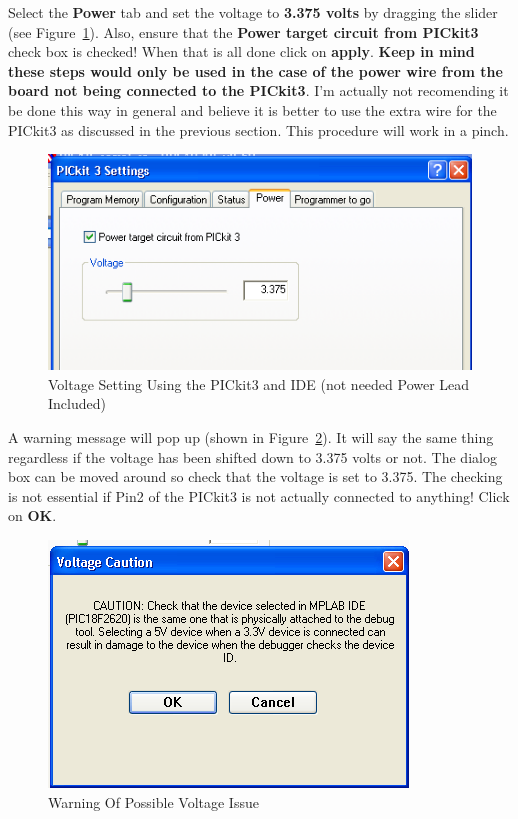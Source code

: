 \documentclass[twocolumn]{article}
\makeatletter
\def\maxwidth{\ifdim\Gin@nat@width>\linewidth\linewidth
\else\Gin@nat@width\fi}
\let\Oldincludegraphics\includegraphics
\renewcommand{\includegraphics}[1]{\Oldincludegraphics[width=\maxwidth]{#1}}
\makeatother
\begin{document}
Select the \textbf{Power} tab and set the voltage to \textbf{3.375
volts} by dragging the slider (see Figure~\ref{voltagesetting}). Also, ensure that the \textbf{Power
target circuit from PICkit3} check box is checked! When that is all done
click on \textbf{apply}. \textbf{Keep in mind these steps would only be used 
in the case of the power wire from the board not being connected to the PICkit3}. I'm
 actually not recomending it be done this way in general and believe it is better to use the 
extra wire for the PICkit3 as discussed in the previous section. This procedure will work in a pinch.

\begin{figure}[htbp]
\centering
\includegraphics{phys1600/power_setting.png}
\caption{Voltage Setting Using the PICkit3 and IDE (not needed Power Lead Included)}
\label{voltagesetting}
\end{figure}

A warning message will pop up (shown in Figure~\ref{voltagecaution}). It will say the 
same thing regardless if
the voltage has been shifted down to 3.375 volts or not. The dialog box
can be moved around so check that the voltage is set to 3.375. The
checking is not essential if Pin2 of the PICkit3 is not actually
connected to anything! Click on \textbf{OK}.

\begin{figure}[htbp]
\centering
\includegraphics{phys1600/voltage_caution.png}
\caption{Warning Of Possible Voltage Issue}
\label{voltagecaution}
\end{figure}
\end{document}
